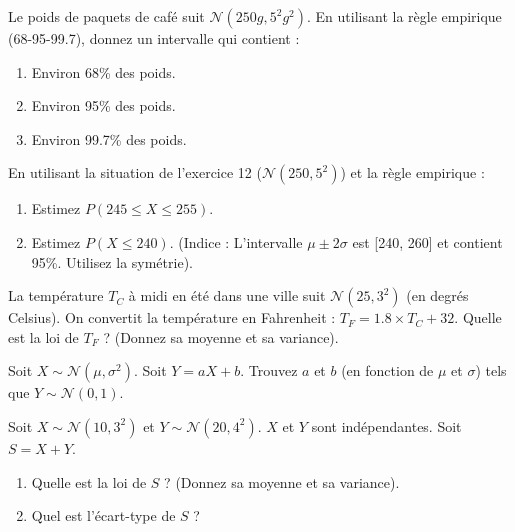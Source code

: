 
\begin{exercicebox}
Le poids de paquets de café suit $\mathcal{N}(250g, 5^2g^2)$.
En utilisant la règle empirique (68-95-99.7), donnez un intervalle qui contient :
\begin{enumerate}
    \item Environ 68\% des poids.
    \item Environ 95\% des poids.
    \item Environ 99.7\% des poids.
\end{enumerate}
\end{exercicebox}

\begin{exercicebox}
En utilisant la situation de l'exercice 12 ($\mathcal{N}(250, 5^2)$) et la règle empirique :
\begin{enumerate}
    \item Estimez $P(245 \le X \le 255)$.
    \item Estimez $P(X \le 240)$. (Indice : L'intervalle $\mu \pm 2\sigma$ est [240, 260] et contient 95\%. Utilisez la symétrie).
\end{enumerate}
\end{exercicebox}


\begin{exercicebox}
La température $T_C$ à midi en été dans une ville suit $\mathcal{N}(25, 3^2)$ (en degrés Celsius).
On convertit la température en Fahrenheit : $T_F = 1.8 \times T_C + 32$.
Quelle est la loi de $T_F$ ? (Donnez sa moyenne et sa variance).
\end{exercicebox}

\begin{exercicebox}
Soit $X \sim \mathcal{N}(\mu, \sigma^2)$. Soit $Y = aX+b$.
Trouvez $a$ et $b$ (en fonction de $\mu$ et $\sigma$) tels que $Y \sim \mathcal{N}(0, 1)$.
\end{exercicebox}

\begin{exercicebox}
Soit $X \sim \mathcal{N}(10, 3^2)$ et $Y \sim \mathcal{N}(20, 4^2)$. $X$ et $Y$ sont indépendantes.
Soit $S = X + Y$.
\begin{enumerate}
    \item Quelle est la loi de $S$ ? (Donnez sa moyenne et sa variance).
    \item Quel est l'écart-type de $S$ ?
\end{enumerate}
\end{exercicebox}

